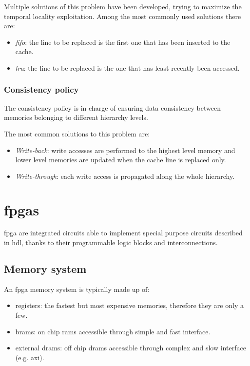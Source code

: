 \documentclass[11pt,a4paper,oneside]{memoir}
\begin{document}
Multiple solutions of this problem have been developed, trying to maximize
the temporal locality exploitation.
Among the most commonly used solutions there are:
\begin{itemize}
	\item \emph{\acl{fifo}}: the line to be replaced is the first
		one that has been inserted to the cache.
	\item \emph{\acl{lru}}: the line to be replaced is the one
		that has least recently been accessed.
\end{itemize}

\subsubsection{Consistency policy}
The consistency policy is in charge of ensuring data consistency between
memories belonging to different hierarchy levels.

The most common solutions to this problem are:
\begin{itemize}
	\item \emph{Write-back}: write accesses are performed to the highest
		level memory and lower level memories are updated when the cache
		line is replaced only.
	\item \emph{Write-through}: each write access is propagated along the
		whole hierarchy.
\end{itemize}

\section{\acp{fpga}}
\acl{fpga} are integrated circuits able to implement special purpose circuits
described in \ac{hdl}, thanks to their programmable logic blocks and
interconnections.
\subsection{Memory system}
An \ac{fpga} memory system is typically made up of:
\begin{itemize}
	\item registers: the fastest but most expensive memories, therefore
		they are only a few.
	\item \acp{bram}: on chip \acp{ram} accessible through simple and fast
		interface.
	\item external \acp{dram}: off chip \acp{dram} accessible through
		complex and slow interface (e.g. \acs{axi}).
\end{itemize}
\end{document}
